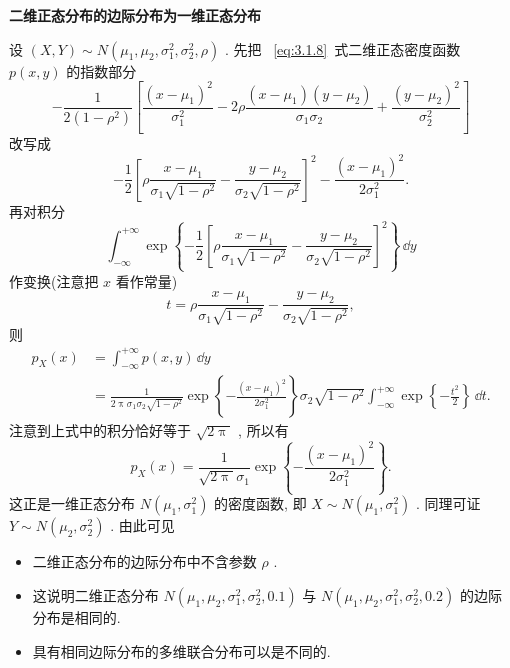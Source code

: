   \begin{example}\label{exam:3.2.5}
  	\textbf{二维正态分布的边际分布为一维正态分布}
  \end{example}
  \begin{solution}
  	设 $(X,Y)\sim N(\mu_1,\mu_2,\sigma_1^2,\sigma_2^2,\rho)$ . 先把 ~\eqref{eq:3.1.8}~式二维正态密度函数 $p(x,y)$ 的指数部分
  	\begin{equation*}
  	-\frac{1}{2(1-\rho^2)}\left[\frac{(x-\mu_1)^2}{\sigma_1^2}-2\rho\frac{(x-\mu_1)(y-\mu_2)}{\sigma_1\sigma_2}+\frac{(y-\mu_2)^2}{\sigma_2^2}\right]
  	\end{equation*}
  	改写成
  	\begin{equation*}
  	-\frac{1}{2}\left[\rho\frac{x-\mu_1}{\sigma_1\sqrt{1-\rho^2}}-\frac{y-\mu_2}{\sigma_2\sqrt{1-\rho^2}}\right]^2-\frac{(x-\mu_1)^2}{2\sigma_1^2}.
  	\end{equation*}
  	再对积分
  	\begin{equation*}
  	\int_{-\infty}^{+\infty}\exp\left\{-\frac{1}{2}\left[\rho\frac{x-\mu_1}{\sigma_1\sqrt{1-\rho^2}}-\frac{y-\mu_2}{\sigma_2\sqrt{1-\rho^2}}\right]^2\right\}\,\dd y
  	\end{equation*}
  	作变换(注意把 $x$ 看作常量)
  	\begin{equation*}
  	t=\rho\frac{x-\mu_1}{\sigma_1\sqrt{1-\rho^2}}-\frac{y-\mu_2}{\sigma_2\sqrt{1-\rho^2}},
  	\end{equation*}
  	则
  	\begin{align*}
  	p_{X}(x) &= \int_{-\infty}^{+\infty}p(x,y)\,\dd y\\
  	&=\frac{1}{2\uppi\sigma_1\sigma_2\sqrt{1-\rho^2}}\exp\left\{-\frac{(x-\mu_1)^2}{2\sigma_1^2}\right\}\sigma_2\sqrt{1-\rho^2}\int_{-\infty}^{+\infty}\exp\left\{-\frac{t^2}{2}\right\}\,\dd t.
  	\end{align*}
  	注意到上式中的积分恰好等于 $\sqrt{2\uppi}$ , 所以有
  	\begin{equation*}
  	p_{X}(x)=\frac{1}{\sqrt{2\uppi}\sigma_1}\exp\left\{-\frac{(x-\mu_1)^2}{2\sigma_1^2}\right\}.
  	\end{equation*}
  	这正是一维正态分布 $N(\mu_1,\sigma_1^2)$ 的密度函数, 即 $X\sim N(\mu_1,\sigma_1^2)$ . 同理可证 $Y\sim N(\mu_2,\sigma_2^2)$ . 由此可见
  	\begin{itemize}
  		\item 二维正态分布的边际分布中不含参数 $\rho$ .
  		\item 这说明二维正态分布 $N(\mu_1,\mu_2,\sigma_1^2,\sigma_2^2,0.1)$ 与 $N(\mu_1,\mu_2,\sigma_1^2,\sigma_2^2,0.2)$ 的边际分布是相同的.
  		\item 具有相同边际分布的多维联合分布可以是不同的.
  	\end{itemize}
  \end{solution}
  
